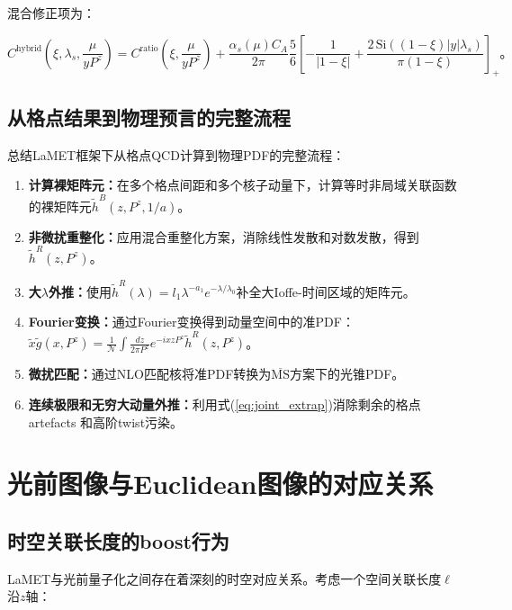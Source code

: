 \documentclass[12pt,a4paper]{ctexart}
\theoremstyle{definition}
\begin{document}
混合修正项为\cite{Chen2025gluon}：

\begin{equation}
C^{\text{hybrid}}\left(\xi, \lambda_s, \frac{\mu}{yP^z}\right) = C^{\text{ratio}}\left(\xi, \frac{\mu}{yP^z}\right) + \frac{\alpha_s(\mu)C_A}{2\pi} \frac{5}{6}\left[-\frac{1}{|1-\xi|} + \frac{2\,\text{Si}((1-\xi)|y|\lambda_s)}{\pi(1-\xi)}\right]_+。
\label{eq:Chybrid}
\end{equation}

\subsection{从格点结果到物理预言的完整流程}

总结LaMET框架下从格点QCD计算到物理PDF的完整流程\cite{Chen2025gluon,Ji2021hybrid}：

\begin{enumerate}
    \item \textbf{计算裸矩阵元：}在多个格点间距和多个核子动量下，计算等时非局域关联函数的裸矩阵元$\tilde{h}^B(z, P^z, 1/a)$。
    \item \textbf{非微扰重整化：}应用混合重整化方案，消除线性发散和对数发散，得到$\tilde{h}^R(z, P^z)$。
    \item \textbf{大$\lambda$外推：}使用$\tilde{h}^R(\lambda) = l_1 \lambda^{-a_1} e^{-\lambda/\lambda_0}$补全大Ioffe-时间区域的矩阵元。
    \item \textbf{Fourier变换：}通过Fourier变换得到动量空间中的准PDF：
    $\tilde{x}\tilde{g}(x, P^z) = \frac{1}{\mathcal{N}}\int \frac{dz}{2\pi P^z} e^{-ixzP^z} \tilde{h}^R(z, P^z)$。
    \item \textbf{微扰匹配：}通过NLO匹配核将准PDF转换为$\overline{\text{MS}}$方案下的光锥PDF。
    \item \textbf{连续极限和无穷大动量外推：}利用式(\ref{eq:joint_extrap})消除剩余的格点 artefacts 和高阶twist污染。
\end{enumerate}

\section{光前图像与Euclidean图像的对应关系}

\subsection{时空关联长度的boost行为}

LaMET与光前量子化之间存在着深刻的时空对应关系\cite{Ji2014LaMET}。考虑一个空间关联长度$\ell$沿$z$轴：
\end{document}
